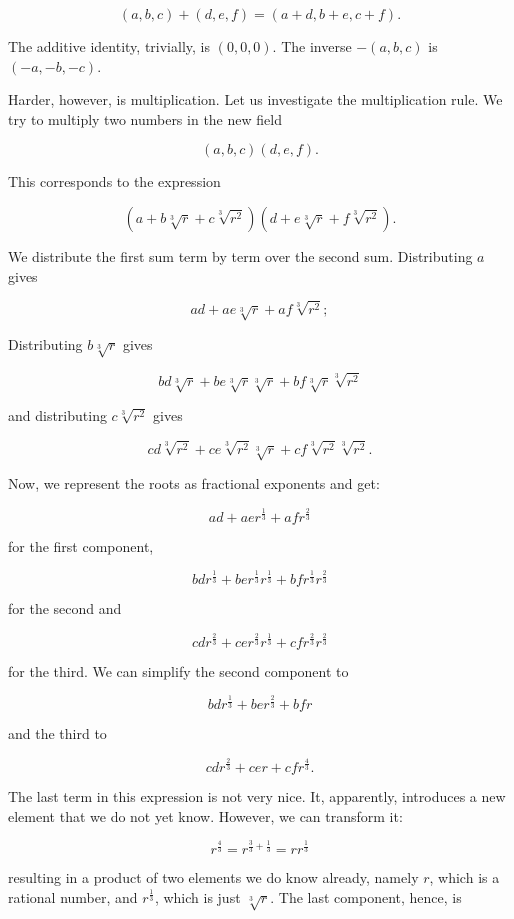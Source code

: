 \documentclass[tikz]{scrreprt}
\begin{document}
\begin{equation}\label{fieldExtAdd3}
(a,b,c) + (d,e,f) = (a+d,b+e,c+f).
\end{equation}

The additive identity, trivially, is $(0,0,0)$.
The inverse $-(a,b,c)$ is $(-a,-b,-c)$.

Harder, however, is multiplication.
Let us investigate the multiplication rule.
We try to multiply two numbers in the new field

\[
(a,b,c)(d,e,f).
\]

This corresponds to the expression

\[
(a+b\sqrt[3]{r}+c\sqrt[3]{r^2})
(d+e\sqrt[3]{r}+f\sqrt[3]{r^2}).
\]

We distribute the first sum term by term
over the second sum.
Distributing $a$ gives

\[
ad+ae\sqrt[3]{r}+af\sqrt[3]{r^2};
\]

Distributing $b\sqrt[3]{r}$ gives

\[
bd\sqrt[3]{r}+be\sqrt[3]{r}\sqrt[3]{r}+bf\sqrt[3]{r}\sqrt[3]{r^2}
\]

and distributing $c\sqrt[3]{r^2}$ gives

\[
cd\sqrt[3]{r^2}+ce\sqrt[3]{r^2}\sqrt[3]{r}+cf\sqrt[3]{r^2}\sqrt[3]{r^2}.
\]

Now, we represent the roots as fractional exponents and get:

\[
ad+aer^{\frac{1}{3}}+afr^{\frac{2}{3}}
\]

for the first component,

\[
bdr^{\frac{1}{3}}+ber^{\frac{1}{3}}r^{\frac{1}{3}}+bfr^{\frac{1}{3}}r^{\frac{2}{3}}
\]

for the second and

\[
cdr^{\frac{2}{3}}+cer^{\frac{2}{3}}r^{\frac{1}{3}}+cfr^{\frac{2}{3}}r^{\frac{2}{3}}
\]

for the third.
We can simplify the second component to

\[
bdr^{\frac{1}{3}}+ber^{\frac{2}{3}}+bfr
\]

and the third to

\[
cdr^{\frac{2}{3}}+cer+cfr^{\frac{4}{3}}.
\]

The last term in this expression is not very nice.
It, apparently, introduces a new element that we do not yet know.
However, we can transform it:

\[
r^{\frac{4}{3}} = r^{\frac{3}{3} + \frac{1}{3}} = rr^{\frac{1}{3}}
\]

resulting in a product of two elements we do know already,
namely $r$, which is a rational number, and $r^{\frac{1}{3}}$,
which is just $\sqrt[3]{r}$.
The last component, hence, is
\end{document}
